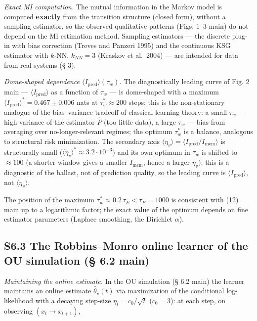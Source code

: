 \documentclass[pdflatex,sn-mathphys-ay]{sn-jnl}
\begin{document}
\emph{Exact MI computation.} The mutual information in the Markov model is computed \textbf{exactly} from the transition structure (closed form), without a sampling estimator, so the observed qualitative patterns (Figs. 1--3 main) do not depend on the MI estimation method. Sampling estimators --- the discrete plug-in with bias correction (Treves and Panzeri 1995) and the continuous KSG estimator with \(k\)-NN, \(k_{NN} = 3\) (Kraskov et al.~2004) --- are intended for data from real systems (§ 3).



\emph{Dome-shaped dependence \(\langle I_{\text{pred}}\rangle(\tau_w)\).} The diagnostically leading curve of Fig. 2 main --- \(\langle I_{\text{pred}}\rangle\) as a function of \(\tau_w\) --- is dome-shaped with a maximum \(\langle I_{\text{pred}}\rangle^* = 0.467 \pm 0.006\) nats at \(\tau_w^* \approx 200\) steps; this is the non-stationary analogue of the bias--variance tradeoff of classical learning theory: a small \(\tau_w\) --- high variance of the estimator \(\hat P\) (too little data), a large \(\tau_w\) --- bias from averaging over no-longer-relevant regimes; the optimum \(\tau_w^*\) is a balance, analogous to structural risk minimization. The secondary axis \(\langle\eta_v\rangle = \langle I_{\text{pred}}/I_{\text{mem}}\rangle\) is structurally small (\(\langle\eta_v\rangle^* \approx 3.2 \cdot 10^{-3}\)) and its own optimum in \(\tau_w\) is shifted to \(\approx 100\) (a shorter window gives a smaller \(I_{\text{mem}}\), hence a larger \(\eta_v\)); this is a diagnostic of the ballast, not of prediction quality, so the leading curve is \(\langle I_{\text{pred}}\rangle\), not \(\langle\eta_v\rangle\).



The position of the maximum \(\tau_w^* \approx 0.2\,\tau_E < \tau_E = 1000\) is consistent with (12) main up to a logarithmic factor; the exact value of the optimum depends on fine estimator parameters (Laplace smoothing, the Dirichlet \(\alpha\)).



\subsection*{S6.3 The Robbins--Monro online learner of the OU simulation (§ 6.2 main)}\label{s6.3-the-robbinsmonro-online-learner-of-the-ou-simulation-6.2-main}



\emph{Maintaining the online estimate.} In the OU simulation (§ 6.2 main) the learner maintains an online estimate \(\hat\theta_v(t)\) via maximization of the conditional log-likelihood with a decaying step-size \(\eta_t = c_0/\sqrt{t}\) (\(c_0 = 3\)): at each step, on observing \((x_t \to x_{t+1})\),
\end{document}
